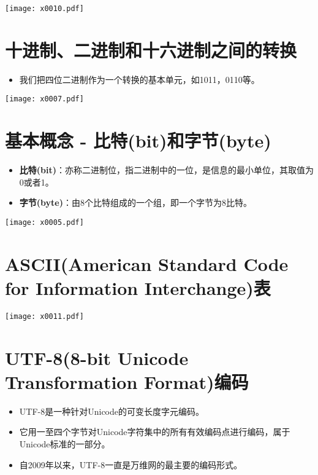 \documentclass[cn,hazy,blue,14pt,screen]{elegantnote}
\begin{document}
\begin{center}
	\texttt{[image: x0010.pdf]}
\end{center}

\newpage

\section{十进制、二进制和十六进制之间的转换}
\begin{itemize}
  \item 我们把四位二进制作为一个转换的基本单元，如1011，0110等。 
\end{itemize}

\begin{center}
	\texttt{[image: x0007.pdf]}
\end{center}

\newpage

\section{基本概念 - 比特(bit)和字节(byte)}

\begin{itemize}
  \item \textbf{比特(bit)}：亦称二进制位，指二进制中的一位，是信息的最小单位，其取值为0或者1。
  \item \textbf{字节(byte)}：由8个比特组成的一个组，即一个字节为8比特。
\end{itemize}

\begin{center}
	\texttt{[image: x0005.pdf]}
\end{center}

\newpage
\section{ASCII(American Standard Code for Information Interchange)表}
\begin{center}
	\texttt{[image: x0011.pdf]}
\end{center}

\newpage

\section{UTF-8(8-bit Unicode Transformation Format)编码}
\begin{itemize}
  \item UTF-8是一种针对Unicode的可变长度字元编码。
  \item 它用一至四个字节对Unicode字符集中的所有有效编码点进行编码，属于Unicode标准的一部分。
  \item 自2009年以来，UTF-8一直是万维网的最主要的编码形式。
\end{itemize}
\end{document}
